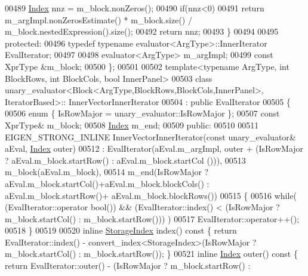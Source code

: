 \begin{DoxyCode}
00489       \hyperlink{group___core___module_a554f30542cc2316add4b1ea0a492ff02}{Index} nnz = m\_block.nonZeros();
00490       \textcolor{keywordflow}{if}(nnz<0)
00491         \textcolor{keywordflow}{return} m\_argImpl.nonZerosEstimate() * m\_block.size() / m\_block.nestedExpression().size();
00492       \textcolor{keywordflow}{return} nnz;
00493     \}
00494 
00495   \textcolor{keyword}{protected}:
00496     \textcolor{keyword}{typedef} \textcolor{keyword}{typename} evaluator<ArgType>::InnerIterator EvalIterator;
00497 
00498     evaluator<ArgType> m\_argImpl;
00499     \textcolor{keyword}{const} XprType &m\_block;
00500 \};
00501 
00502 \textcolor{keyword}{template}<\textcolor{keyword}{typename} ArgType, \textcolor{keywordtype}{int} BlockRows, \textcolor{keywordtype}{int} BlockCols, \textcolor{keywordtype}{bool} InnerPanel>
00503 \textcolor{keyword}{class }unary\_evaluator<Block<ArgType,BlockRows,BlockCols,InnerPanel>, IteratorBased>::
      InnerVectorInnerIterator
00504  : \textcolor{keyword}{public} EvalIterator
00505 \{
00506   \textcolor{keyword}{enum} \{ IsRowMajor = unary\_evaluator::IsRowMajor \};
00507   \textcolor{keyword}{const} XprType& m\_block;
00508   \hyperlink{group___core___module_a554f30542cc2316add4b1ea0a492ff02}{Index} m\_end;
00509 \textcolor{keyword}{public}:
00510 
00511   EIGEN\_STRONG\_INLINE InnerVectorInnerIterator(\textcolor{keyword}{const} unary\_evaluator& aEval, 
      \hyperlink{group___core___module_a554f30542cc2316add4b1ea0a492ff02}{Index} outer)
00512     : EvalIterator(aEval.m\_argImpl, outer + (IsRowMajor ? aEval.m\_block.startRow() : aEval.m\_block.startCol
      ())),
00513       m\_block(aEval.m\_block),
00514       m\_end(IsRowMajor ? aEval.m\_block.startCol()+aEval.m\_block.blockCols() : aEval.m\_block.startRow()+
      aEval.m\_block.blockRows())
00515   \{
00516     \textcolor{keywordflow}{while}( (EvalIterator::operator \textcolor{keywordtype}{bool}()) && (EvalIterator::index() < (IsRowMajor ? m\_block.startCol() : 
      m\_block.startRow())) )
00517       EvalIterator::operator++();
00518   \}
00519 
00520   \textcolor{keyword}{inline} \hyperlink{group___sparse_core___module_a0b540ba724726ebe953f8c0df06081ed}{StorageIndex} index()\textcolor{keyword}{ const }\{ \textcolor{keywordflow}{return} EvalIterator::index() - 
      convert\_index<StorageIndex>(IsRowMajor ? m\_block.startCol() : m\_block.startRow()); \}
00521   \textcolor{keyword}{inline} \hyperlink{group___core___module_a554f30542cc2316add4b1ea0a492ff02}{Index} outer()\textcolor{keyword}{  const }\{ \textcolor{keywordflow}{return} EvalIterator::outer() - (IsRowMajor ? m\_block.startRow() : 

\end{DoxyCode}
